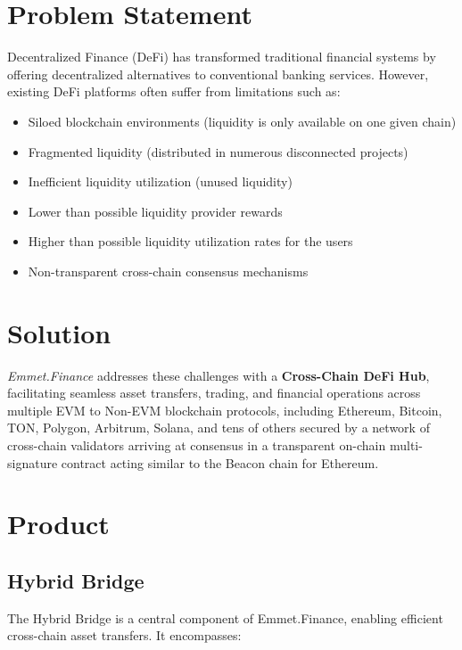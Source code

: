 \documentclass[12pt, a4paper]{article}
\begin{document}
\section{Problem Statement}

Decentralized Finance (DeFi) has transformed traditional financial systems by offering decentralized alternatives to conventional banking services. However, existing DeFi platforms often suffer from limitations such as: 

\begin{itemize}
    \item Siloed blockchain environments (liquidity is only available on one given chain)
    \item Fragmented liquidity (distributed in numerous disconnected projects)
    \item Inefficient liquidity utilization (unused liquidity)
    \item Lower than possible liquidity provider rewards
    \item Higher than possible liquidity utilization rates for the users
    \item Non-transparent cross-chain consensus mechanisms
\end{itemize}

\section{Solution}

\textit{Emmet.Finance} addresses these challenges with a \textbf{Cross-Chain DeFi Hub}, facilitating seamless asset transfers, trading, and financial operations across multiple EVM to Non-EVM blockchain protocols, including Ethereum, Bitcoin, TON, Polygon, Arbitrum, Solana, and tens of others secured by a network of cross-chain validators arriving at consensus in a transparent on-chain multi-signature contract acting similar to the Beacon chain for Ethereum.

\section{Product}

\subsection{Hybrid Bridge}

The Hybrid Bridge is a central component of Emmet.Finance, enabling efficient cross-chain asset transfers. It encompasses:
\end{document}
